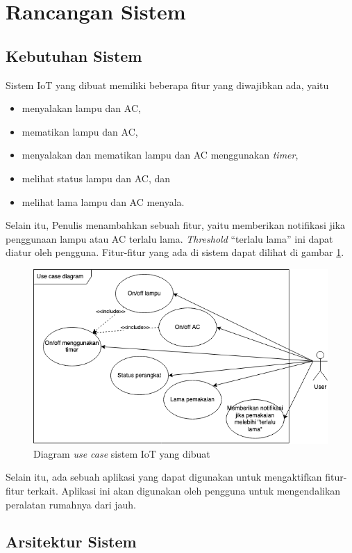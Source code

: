 \documentclass[conference]{IEEEtran}
\begin{document}
\section{Rancangan Sistem}\label{sect-rancangan}
\subsection{Kebutuhan Sistem}
Sistem IoT yang dibuat memiliki beberapa fitur yang diwajibkan ada, yaitu
\begin{itemize}
    \item menyalakan lampu dan AC,
    \item mematikan lampu dan AC,
    \item menyalakan dan mematikan lampu dan AC menggunakan \textit{timer},
    \item melihat status lampu dan AC, dan
    \item melihat lama lampu dan AC menyala.
\end{itemize}
Selain itu, Penulis menambahkan sebuah fitur, yaitu memberikan notifikasi jika
penggunaan lampu atau AC terlalu lama. \textit{Threshold} ``terlalu lama'' ini
dapat diatur oleh pengguna. Fitur-fitur yang ada di sistem dapat dilihat di
gambar \ref{diag-use-case}.

\begin{figure}[htbp]
\centerline{\includegraphics[scale=0.4]{diagrams/use-case.png}}
\caption{Diagram \textit{use case} sistem IoT yang dibuat}
\label{diag-use-case}
\end{figure}

Selain itu, ada sebuah aplikasi yang dapat digunakan untuk mengaktifkan
fitur-fitur terkait. Aplikasi ini akan digunakan oleh pengguna untuk
mengendalikan peralatan rumahnya dari jauh.

\subsection{Arsitektur Sistem}
\end{document}
